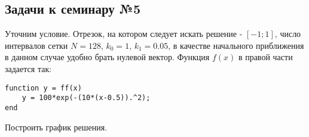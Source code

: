 \subsection{Задачи к семинару №5}
Уточним условие. Отрезок, на котором следует искать решение - $[-1; 1]$, число интервалов сетки $N = 128$, $k_0 = 1$, $k_1 = 0.05$, в качестве начального приближения в данном случае удобно брать нулевой вектор. Функция $f(x)$ в правой части задается так:
\begin{matlablisting}
	\begin{lstlisting}
function y = ff(x)
    y = 100*exp(-(10*(x-0.5)).^2);
end
	\end{lstlisting}
\end{matlablisting}
Построить график решения.
